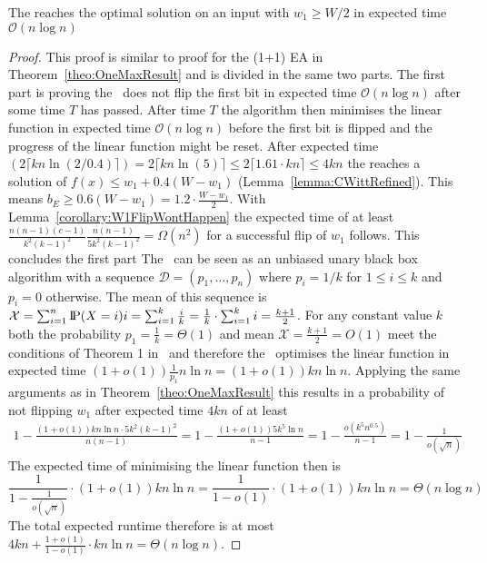 \begin{lemma}\label{lemma:RLSRoneMaxInput}
      The \RLSR[k] reaches the optimal solution on an input with $w_1\ge W/2$ in expected time $\mathcal{O}(n\log{}n)$
\end{lemma}
\begin{proof}
      This proof is similar to proof for the (1+1) EA in Theorem~\ref{theo:OneMaxResult} and is divided in the same two parts.
      The first part is proving the \RLSR~does not flip the first bit in expected time $\mathcal{O}(n\log{}n)$ after some time $T$ has passed.
      After time $T$ the algorithm then minimises the linear function in expected time $\mathcal{O}(n\log{}n)$ before the first bit is flipped and the progress of the linear function might be reset.
      After expected time $(2\lceil kn\ln(2/0.4)\rceil)=2\lceil kn\ln(5)\rceil\le2\lceil 1.61\cdot kn\rceil\le4kn$ the \RLSR[k] reaches a solution of \(f(x)\le w_1+0.4(W-w_1)\) (Lemma~\ref{lemma:CWittRefined}).
      This means \(b_E \ge 0.6(W-w_1) = 1.2\cdot\frac{W-w_1}{2}\).
      With Lemma~\ref{corollary:W1FlipWontHappen} the expected time of at least \(\frac{n(n-1)(c-1)}{k^2{(k-1)}^2}\frac{n(n-1)}{5k^2{(k-1)}^2}=\Omega(n^2)\) for a successful flip of $w_1$ follows. This concludes the first part\newline
      The \RLSR~can be seen as an unbiased unary black box algorithm with a sequence $\mathcal{D}=(p_1,\dots,p_n)$ where $p_i=1/k$ for $1\le i\le k$ and $p_i=0$ otherwise.
      The mean of this sequence is \(\mathcal{X}=\sum_{i=1}^{n}{\text{I\kern-0.15em P}(X=i)i}=\sum_{i=1}^{k}{\frac{i}{k}}=\frac{1}{k}\cdot\sum_{i=1}^{k}{i}=\frac{k+1}{2}\).
      For any constant value $k$ both the probability $p_1=\frac{1}{k}=\Theta(1)$ and mean $\mathcal{X}=\frac{k+1}{2}=O(1)$ meet the conditions of Theorem 1 in~\cite{doerr2023tight} and therefore the \RLSR~optimises the linear function in expected time \((1+o(1))\frac{1}{p_1}n\ln n=(1+o(1))kn\ln n\).
      Applying the same arguments as in Theorem~\ref{theo:OneMaxResult} this results in a probability of not flipping $w_1$ after expected time $4kn$ of at least
      \begin{gather}\nonumber
            1-\frac{(1+o(1))kn\ln n\cdot5k^2{(k-1)}^2}{n(n-1)}
            =1-\frac{(1+o(1))5k^5\ln n}{n-1}
            =1-\frac{o(k^5n^{0.5})}{n-1}
            =1-\frac{1}{o(\sqrt{n})}
      \end{gather}
      The expected time of minimising the linear function then is
      \[\frac{1}{1-\frac{1}{o(\sqrt{n})}}\cdot(1+o(1))kn\ln n=\frac{1}{1-o(1)}\cdot(1+o(1))kn\ln n=\Theta(n\log{}n)\]
      The total expected runtime therefore is at most $4kn+\frac{1+o(1)}{1-o(1)}\cdot kn\ln n=\Theta(n\log{}n)$.


\end{proof}
